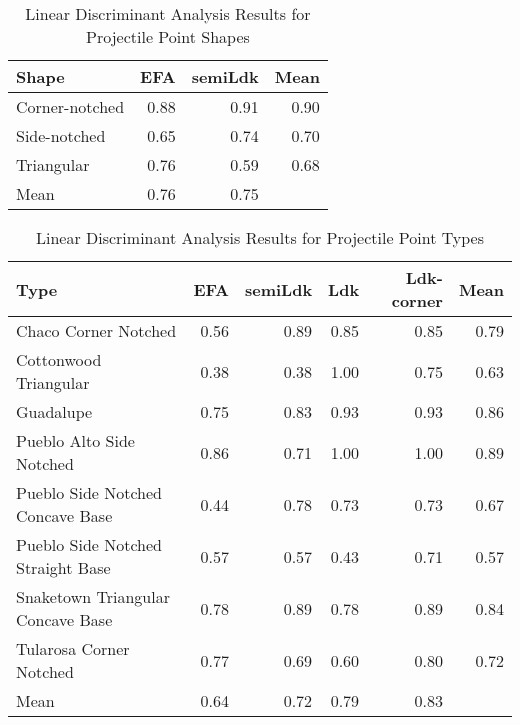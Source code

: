 \documentclass[PCJ,Unicode,screen,mode=plain]{cedram}
\begin{document}
\begin{table}

\caption{\label{tab:LDAResultsShape}Linear Discriminant Analysis Results for Projectile Point Shapes}
\centering
\begin{tabular}[t]{lrrr}
\toprule
Shape & EFA & semiLdk & Mean\\
\midrule
Corner-notched & 0.88 & 0.91 & 0.90\\
Side-notched & 0.65 & 0.74 & 0.70\\
Triangular & 0.76 & 0.59 & 0.68\\
Mean & 0.76 & 0.75 & \\
\bottomrule
\end{tabular}
\end{table}

\begin{table}

\caption{\label{tab:LDAResultsType}Linear Discriminant Analysis Results for Projectile Point Types}
\centering
\begin{tabular}[t]{lrrrrr}
\toprule
Type & EFA & semiLdk & Ldk & Ldk-corner & Mean\\
\midrule
Chaco Corner Notched & 0.56 & 0.89 & 0.85 & 0.85 & 0.79\\
Cottonwood Triangular & 0.38 & 0.38 & 1.00 & 0.75 & 0.63\\
Guadalupe & 0.75 & 0.83 & 0.93 & 0.93 & 0.86\\
Pueblo Alto Side Notched & 0.86 & 0.71 & 1.00 & 1.00 & 0.89\\
Pueblo Side Notched Concave Base & 0.44 & 0.78 & 0.73 & 0.73 & 0.67\\
\addlinespace
Pueblo Side Notched Straight Base & 0.57 & 0.57 & 0.43 & 0.71 & 0.57\\
Snaketown Triangular Concave Base & 0.78 & 0.89 & 0.78 & 0.89 & 0.84\\
Tularosa Corner Notched & 0.77 & 0.69 & 0.60 & 0.80 & 0.72\\
Mean & 0.64 & 0.72 & 0.79 & 0.83 & \\
\bottomrule
\end{tabular}
\end{table}
\end{document}
